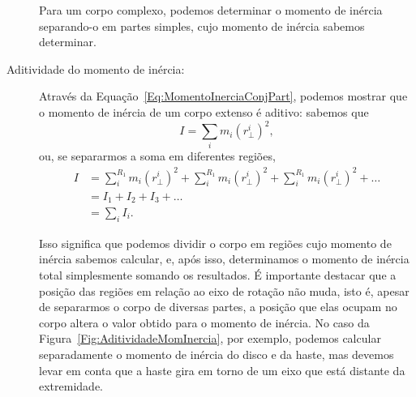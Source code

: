\begin{description}
\begin{marginfigure}[2cm]
\caption{Para um corpo complexo, podemos determinar o momento de inércia separando-o em partes simples, cujo momento de inércia sabemos determinar. \label{Fig:AditividadeMomInercia}}
\end{marginfigure}

    \item[Aditividade do momento de inércia:] Através da Equação~\ref{Eq:MomentoInerciaConjPart}, podemos mostrar que o momento de inércia de um corpo extenso é aditivo: sabemos que
\begin{equation}
    I = \sum_i m_i (r_\perp^i)^2,
\end{equation}
%
ou, se separarmos a soma em diferentes regiões,
\begin{align}
    I &= \sum_{i}^{R_1} m_i (r_\perp^i)^2 + \sum_{i}^{R_1} m_i (r_\perp^i)^2 + \sum_{i}^{R_1} m_i (r_\perp^i)^2 + \dots \\
    &= I_1 + I_2 + I_3 + \dots \\
    &= \sum_i I_i.
\end{align}

Isso significa que podemos dividir o corpo em regiões cujo momento de inércia sabemos calcular, e, após isso, determinamos o momento de inércia total simplesmente somando os resultados. É importante destacar que a posição das regiões em relação ao eixo de rotação não muda, isto é, apesar de separarmos o corpo de diversas partes, a posição que elas ocupam no corpo altera o valor obtido para o momento de inércia. No caso da Figura~\ref{Fig:AditividadeMomInercia}, por exemplo, podemos calcular separadamente o momento de inércia do disco e da haste, mas devemos levar em conta que a haste gira em torno de um eixo que está distante da extremidade.
\end{description}

